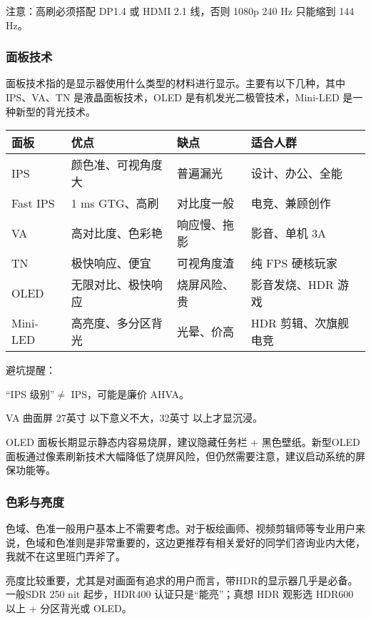 \documentclass[../main.tex]{subfiles}
\begin{document}
注意：高刷必须搭配 DP1.4 或 HDMI 2.1 线，否则 1080p 240 Hz 只能缩到 144 Hz。

\subsubsection{面板技术}

面板技术指的是显示器使用什么类型的材料进行显示。主要有以下几种，其中IPS、VA、TN 是液晶面板技术，OLED 是有机发光二极管技术，Mini-LED 是一种新型的背光技术。

\begin{table}[ht]
  \centering
  \begin{tabular}{l|l|l|l}
    \hline
    面板 & 优点 & 缺点 & 适合人群 \\
    \hline
    IPS & 颜色准、可视角度大 & 普遍漏光 & 设计、办公、全能 \\
    Fast IPS & 1 ms GTG、高刷 & 对比度一般 & 电竞、兼顾创作 \\
    VA & 高对比度、色彩艳 & 响应慢、拖影 & 影音、单机 3A \\
    TN & 极快响应、便宜 & 可视角度渣 & 纯 FPS 硬核玩家 \\
    OLED & 无限对比、极快响应 & 烧屏风险、贵 & 影音发烧、HDR 游戏 \\
    Mini-LED & 高亮度、多分区背光 & 光晕、价高 & HDR 剪辑、次旗舰电竞 \\
    \hline
  \end{tabular}
\end{table}

避坑提醒：

“IPS 级别”$\neq$ IPS，可能是廉价 AHVA。

VA 曲面屏 27英寸 以下意义不大，32英寸 以上才显沉浸。

OLED 面板长期显示静态内容易烧屏，建议隐藏任务栏 + 黑色壁纸。新型OLED面板通过像素刷新技术大幅降低了烧屏风险，但仍然需要注意，建议启动系统的屏保功能等。

\subsubsection{色彩与亮度}

色域、色准一般用户基本上不需要考虑。对于板绘画师、视频剪辑师等专业用户来说，色域和色准则是非常重要的，这边更推荐有相关爱好的同学们咨询业内大佬，我就不在这里班门弄斧了。

亮度比较重要，尤其是对画面有追求的用户而言，带HDR的显示器几乎是必备。一般SDR 250 nit 起步，HDR400 认证只是“能亮”；真想 HDR 观影选 HDR600 以上 + 分区背光或 OLED。
\end{document}
